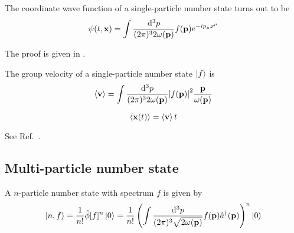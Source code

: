 \begin{lemma}\label{thm:single_particle_number_state_wave_function}
	The coordinate wave function of a single-particle number state turns out to be
	\begin{equation}
		\psi(t,\vb{x})
		=
		\int\frac{\dd[3]{p}}{(2\pi)^32\omega(\vb{p})}
		f(\vb{p})e^{-ip_\mu x^\mu}
	\end{equation}
\end{lemma}
The proof is given in .
\begin{lemma}\label{thm:single_particle_number_state_group_velocity}
	The group velocity of a single-particle number state $\ket{f}$ is
	\begin{equation}
		\expval{\vb{v}}
		=
		\int\frac{\dd[3]{p}}{(2\pi)^32\omega(\vb{p})}
		\abs{f(\vb{p})}^2
		\frac{\vb{p}}{\omega(\vb{p})}
		\label{eq:single_particle_number_state_group_velocity}
	\end{equation}
\end{lemma}
\begin{example}
	\begin{equation}
		\expval{\vb{x}(t)}
		=
		\expval{\vb{v}}t
	\end{equation}	
\end{example}
\begin{example}
	See Ref.~\cite{Naumov2013}.
\end{example}

\subsection{Multi-particle number state}

\begin{definition}
	A $n$-particle number state with spectrum $f$ is given by
	\begin{equation}
		\ket{n,f}
		=
		\frac{1}{n!}
		\hat\phi[f]^n
		\ket{0}
		=
		\frac{1}{n!}
		\left(
			\int\frac{\dd[3]{p}}{(2\pi)^3\sqrt{2\omega(\vb{p})}}
			f(\vb{p})
			\hat{a}^\dagger(\vb{p})
		\right)^n
		\ket{0}
	\end{equation}
\end{definition}
\begin{theorem}

\end{theorem}

